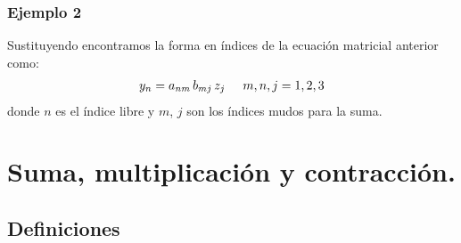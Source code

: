 \documentclass[12pt]{beamer}
\begin{document}
\begin{frame}
\frametitle{Ejemplo 2}
Sustituyendo encontramos la forma en índices de la ecuación matricial anterior como:
\begin{align*}
y_{n} = a_{nm} \, b_{mj} \, z_{j} \hspace{0.5cm} m, n, j = 1, 2, 3
\end{align*}
donde $n$ es el índice libre y $m$, $j$ son los índices mudos para la suma.
\end{frame}

\section{Suma, multiplicación y contracción.}
\subsection{Definiciones}
\end{document}
